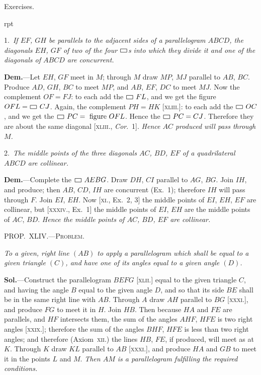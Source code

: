 \documentclass[oneside]{book}
\newcommand\pgram{
	\setlength{\unitlength}{1pt}
	\begin{picture}(11,8)(0,0)
	\linethickness{0.5pt}
	\put(1,0){\line(1,0){9}}
	\put(1,0){\line(0,1){5}}
	\put(1,5){\line(1,0){9}}
	\put(10,0){\line(0,1){5}}
	\end{picture}}
\newcommand\mypropl[2]{
\bigskip\Needspace*{4\baselineskip}\begin{center}\textsc{#1}\end{center}
\hspace{\parindent}\emph{#2}\par\medskip
}
\newcommand\exhead[1]{
\Needspace*{5\baselineskip}\begin{center}
\textsf{#1}
\end{center}
}
\newcommand\imgflow[3]{
\setcounter{wrapwidth}{#1}
\begin{wrapfigure}[#2]{r}{\value{wrapwidth}pt}
\begin{center}
\vspace{-0.3in}
\end{center}
\end{wrapfigure}
}
\newcommand\imgcent[2]{
\begin{center}
\end{center}
}
\begin{document}
\exhead{Exercises.}

\imgflow{170}{13}{f064}

\begin{footnotesize}
1.~\emph{If $EF$, $GH$ be parallels to the adjacent sides of a parallelogram
$ABCD$, the diagonals
$EH$, $GF$ of two of
the four $\pgram$s into which
they divide it and one of
the diagonals of $ABCD$
are concurrent.}

\textbf{Dem.}---Let $EH$, $GF$
meet in $M$; through $M$
draw $MP$, $MJ$ parallel to
$AB$, $BC$. Produce $AD$,
$GH$, $BC$ to meet $MP$,
and $AB$, $EF$, $DC$ to meet
$MJ$. Now the complement $OF = FJ$: to each add the $\pgram~FL$,
and we get the figure $OFL = \pgram~CJ$. Again, the complement
$PH=HK$ [\textsc{xliii}.]: to each add the $\pgram~OC$, and we get the $\pgram~PC
=\text{\ figure } OFL$. Hence the $\pgram~PC = CJ$. Therefore they are
about the same diagonal [\textsc{xliii}., \textit{Cor}.~1]. \emph{Hence $AC$ produced
will pass through $M$.}

2.~\emph{The middle points of the three diagonals $AC$, $BD$, $EF$ of
a quadrilateral $ABCD$ are
collinear.}

\imgcent{158}{f065}

\textbf{Dem.}---Complete the
$\pgram~AEBG$. Draw $DH$, $CI$
parallel to $AG$, $BG$. Join
$IH$, and produce; then $AB$,
$CD$, $IH$ are concurrent
(Ex.~1); therefore $IH$ will
pass through $F$. Join $EI$,
$EH$. Now [\textsc{xi}., Ex.~2, 3]
the middle points of $EI$,
$EH$, $EF$ are collinear, but
[\textsc{xxxiv}., Ex.~1] the middle
points of $EI$, $EH$ are the
middle points of $AC$, $BD$.
\emph{Hence the middle points of $AC$, $BD$, $EF$ are collinear.}
\par\end{footnotesize}


\mypropl{PROP\@.~XLIV\@.---Problem.}{To a given, right line $(AB)$ to apply a parallelogram
which shall be equal to a given triangle $(C)$, and have one
of its angles equal to a given angle $(D)$.}

\imgcent{240}{f066}

\textbf{Sol.}---Construct the parallelogram $BEFG$ [\textsc{xlii}.] equal
to the given triangle $C$, and having the angle $B$ equal
to the given angle $D$, and so that its side $BE$ shall be in
the same right line with $AB$. Through $A$ draw $AH$
parallel to $BG$ [\textsc{xxxi}.], and produce $FG$ to meet it in $H$.
Join $HB$. Then because $HA$ and $FE$ are parallels, and
$HF$ intersects them, the sum of the angles $AHF$, $HFE$
is two right angles [\textsc{xxix}.]; therefore the sum of the
angles $BHF$, $HFE$ is less than two right angles; and
therefore (Axiom~\textsc{xii}.) the lines $HB$, $FE$, if produced,
will meet as at $K$. Through $K$ draw $KL$ parallel to
$AB$ [\textsc{xxxi}.], and produce $HA$ and $GB$ to meet it in the
points $L$ and $M$. \emph{Then $AM$ is a parallelogram fulfilling
the required conditions.}
\end{document}
